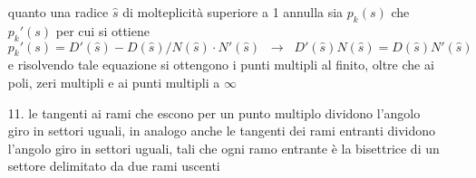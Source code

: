 \begin{itemize}
	quanto una radice \(\hat{s}\) di molteplicità superiore a 1 annulla sia \(p_k(s)\) che \(p_k'(s)\) per cui si ottiene
	\(p_k'(s) = D'(\hat{s})-D(\hat{s})/N(\hat{s})\cdot N'(\hat{s}) \;\;\rightarrow\;\; D'(\hat{s})N(\hat{s})=D(\hat{s})N'(\hat{s})\)
	e risolvendo tale equazione si ottengono i punti multipli al finito, oltre che ai poli, zeri multipli e ai punti multipli a \(\infty\)
	\item[11.] le tangenti ai rami che escono per un punto multiplo dividono l'angolo giro in settori uguali, in analogo anche
	le tangenti dei rami entranti dividono l'angolo giro in settori uguali, tali che ogni ramo entrante è la bisettrice di un
	settore delimitato da due rami uscenti
\end{itemize}